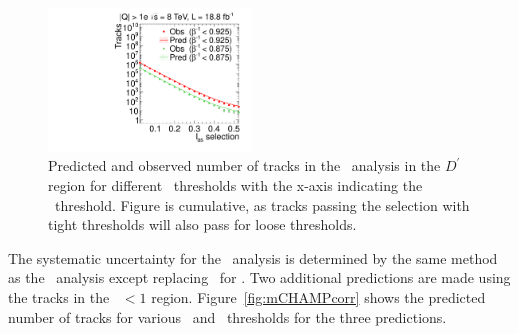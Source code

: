 \begin{figure}
 \begin{center}
  \includegraphics[clip=false, trim=0.0cm 0cm 0.0cm 0cm, width=0.48\textwidth]{figures/multi/Prediction_Data8TeV_NPredVsNObs_Flip}
 \end{center}
 \caption[Predicted and observed number of tracks in the \invbeta\ $<$ 1 region for different sets of thresholds in the \multi\ analysis.]
{Predicted and observed number of tracks in the \multi\ analysis in the $D^{\prime}$ region for different \invbeta\ thresholds with the x-axis indicating the \ias\ threshold.
Figure is cumulative, as tracks passing the selection with tight thresholds will also pass for loose thresholds.
}
\label{fig:MultiPred}
\end{figure}

The systematic uncertainty for the \multi\ analysis is determined by the same method as the \muononly\ analysis except replacing \pt\ for \ias. 
Two additional predictions are made using the tracks in the \invbeta\ $< 1$ region.
Figure~\ref{fig:mCHAMPcorr} shows the predicted number of tracks for various \invbeta\ and \dedx\ thresholds for the three predictions.

